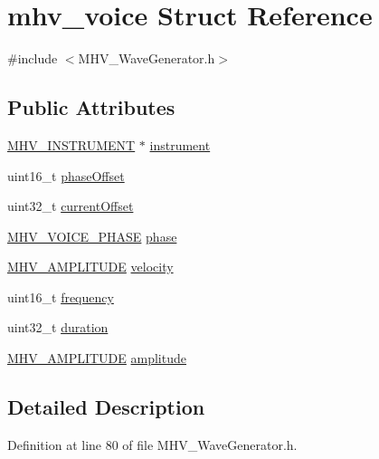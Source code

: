\hypertarget{structmhv__voice}{\section{mhv\-\_\-voice Struct Reference}
\label{structmhv__voice}
}


{\ttfamily \#include $<$M\-H\-V\-\_\-\-Wave\-Generator.\-h$>$}

\subsection*{Public Attributes}
\begin{DoxyCompactItemize}
\item 
\hyperlink{_m_h_v___wave_generator_8h_ad8420c0a6c4bf917359c2c4f2e7720d3}{M\-H\-V\-\_\-\-I\-N\-S\-T\-R\-U\-M\-E\-N\-T} $\ast$ \hyperlink{structmhv__voice_ad13f45665cd3e683530f21ac2824aa5d}{instrument}
\item 
uint16\-\_\-t \hyperlink{structmhv__voice_a24e2f2d4a979d1f00b338b48f741c217}{phase\-Offset}
\item 
uint32\-\_\-t \hyperlink{structmhv__voice_a338eb6b52bea8bcedc46dab7e854d138}{current\-Offset}
\item 
\hyperlink{_m_h_v___wave_generator_8h_ac654c7265d33a8268f0fae7e46219fe2}{M\-H\-V\-\_\-\-V\-O\-I\-C\-E\-\_\-\-P\-H\-A\-S\-E} \hyperlink{structmhv__voice_acb00a6c0fe99ecfebb9f5b1ed66c51be}{phase}
\item 
\hyperlink{_m_h_v___wave_generator_8h_ae0ff00bbcfd596fc3d6afab09bb5e11c}{M\-H\-V\-\_\-\-A\-M\-P\-L\-I\-T\-U\-D\-E} \hyperlink{structmhv__voice_a8f99a4e928e8698be419b3863232bc62}{velocity}
\item 
uint16\-\_\-t \hyperlink{structmhv__voice_a4b98f1d1e32ae313d6f30b9f6a32d2fd}{frequency}
\item 
uint32\-\_\-t \hyperlink{structmhv__voice_a1e3b7b6c0a725010eb983f606e93079d}{duration}
\item 
\hyperlink{_m_h_v___wave_generator_8h_ae0ff00bbcfd596fc3d6afab09bb5e11c}{M\-H\-V\-\_\-\-A\-M\-P\-L\-I\-T\-U\-D\-E} \hyperlink{structmhv__voice_a23c0a77a91913bf94930bb9f0e9fc28b}{amplitude}
\end{DoxyCompactItemize}


\subsection{Detailed Description}


Definition at line 80 of file M\-H\-V\-\_\-\-Wave\-Generator.\-h.



